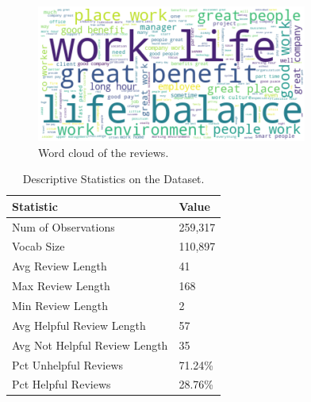 \documentclass[11pt,a4paper]{article}
\begin{document}
	\begin{figure}[h]
		\begin{center}
			\includegraphics[scale=0.75]{wordcloud}
			\caption[scale=0.75]{Word cloud of the reviews.}
		\end{center}
	\end{figure}
	
	\begin{table}[h]
		\begin{center}
			\begin{tabular}{|l|l|}
				\hline \textbf{Statistic} & \textbf{Value} \\ \hline
				Num of Observations & 259,317 \\
				Vocab Size & 110,897 \\
				Avg Review Length & 41 \\
				Max Review Length & 168 \\
				Min Review Length & 2 \\
				Avg Helpful Review Length & 57 \\
				Avg Not Helpful Review Length & 35 \\
				Pct Unhelpful Reviews & 71.24\% \\
				Pct Helpful Reviews & 28.76\% \\
				\hline
			\end{tabular}
			\caption[scale=0.75]{Descriptive Statistics on the Dataset.}
		\end{center}
	\end{table}
	
\end{document}
